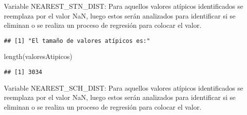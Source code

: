 \documentclass[
]{article}
\newenvironment{Shaded}{\begin{snugshade}}{\end{snugshade}}
\newcommand{\ConstantTok}[1]{\textcolor[rgb]{0.00,0.00,0.00}{#1}}
\newcommand{\FunctionTok}[1]{\textcolor[rgb]{0.00,0.00,0.00}{#1}}
\newcommand{\NormalTok}[1]{#1}
\newcommand{\OtherTok}[1]{\textcolor[rgb]{0.56,0.35,0.01}{#1}}
\newcommand{\SpecialCharTok}[1]{\textcolor[rgb]{0.00,0.00,0.00}{#1}}
\newcommand{\StringTok}[1]{\textcolor[rgb]{0.31,0.60,0.02}{#1}}
\begin{document}
Variable NEAREST\_STN\_DIST: Para aquellos valores atípicos
identificados se reemplaza por el valor NaN, luego estos serán
analizados para identificar si se eliminan o se realiza un proceso de
regresión para colocar el valor.

\begin{Shaded}
\end{Shaded}

\begin{verbatim}
## [1] "El tamaño de valores atípicos es:"
\end{verbatim}

\begin{Shaded}
\begin{Highlighting}[]
\FunctionTok{length}\NormalTok{(valoresAtipicos)}
\end{Highlighting}
\end{Shaded}

\begin{verbatim}
## [1] 3034
\end{verbatim}

\begin{Shaded}
\end{Shaded}

Variable NEAREST\_SCH\_DIST: Para aquellos valores atípicos
identificados se reemplaza por el valor NaN, luego estos serán
analizados para identificar si se eliminan o se realiza un proceso de
regresión para colocar el valor.

\begin{Shaded}
\end{Shaded}
\end{document}
